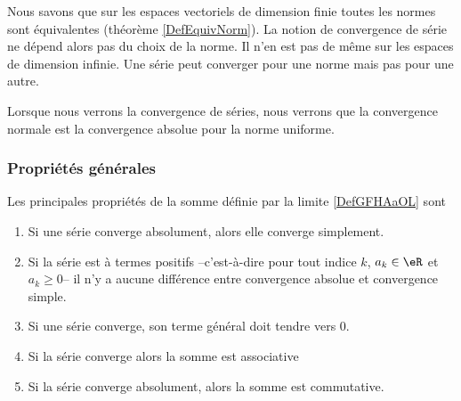 \begin{remark}
    Nous savons que sur les espaces vectoriels de dimension finie toutes les normes sont équivalentes (théorème \ref{DefEquivNorm}). La notion de convergence de série ne dépend alors pas du choix de la norme. Il n'en est pas de même sur les espaces de dimension infinie. Une série peut converger pour une norme mais pas pour une autre.
\end{remark}
Lorsque nous verrons la convergence de séries, nous verrons que la convergence normale est la convergence absolue pour la norme uniforme.

\subsubsection{Propriétés générales}

\begin{proposition}\label{propnseries_propdebase}
Les principales propriétés de la somme définie par la limite \eqref{DefGFHAaOL} sont
  \begin{enumerate}
  \item Si une série converge absolument, alors elle converge simplement.
  \item Si la série est à termes positifs --c'est-à-dire pour tout indice $k$, $a_k \in \eR$ et $a_k \geq 0$-- il n'y a aucune différence entre convergence absolue et convergence simple.
  \item\label{point3-seriepropdebase} Si une série converge, son terme général doit tendre vers $0$.
\item 
Si la série converge alors la somme est associative
\item
Si la série converge absolument, alors la somme est commutative.
  \end{enumerate}
\end{proposition}

